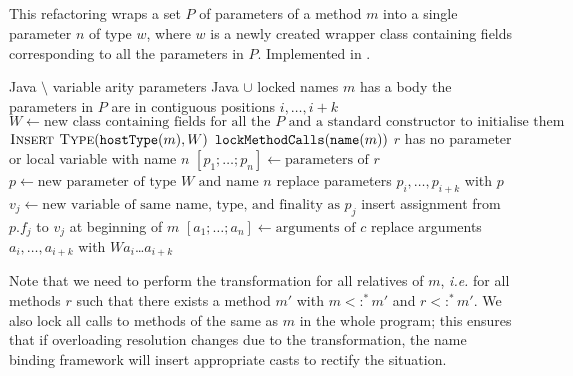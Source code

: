 \subsection{}
This refactoring wraps a set $P$ of parameters of a method $m$ into a single parameter $n$ of type $w$, where $w$ is a newly created wrapper class containing fields corresponding to all the parameters in $P$. Implemented in .

\begin{algorithm}
\caption{$\refactoring{Introduce Parameter Object}(m : \type{Method}, P : \settp{\type{Parameter}}, w : \settp{Name}, n : \settp{Name})$}
\begin{algorithmic}[1]
\REQUIRE Java $\setminus$ variable arity parameters
\ENSURE Java $\cup$ locked names
\medskip
\STATE \assert $m$ has a body
\STATE \assert the parameters in $P$ are in contiguous positions $i, \ldots, i+k$
\STATE $W \leftarrow \text{new class containing fields for all the $P$ and a standard constructor to initialise them}$
\STATE $\textsc{Insert Type}(\text{\texttt{hostType}}(m), W)$
\STATE $\text{\texttt{lockMethodCalls}}(\text{\texttt{name}}(m))$
  \STATE \assert $r$ has no parameter or local variable with name $n$
  \STATE $[p_1;\ldots;p_n] \leftarrow \text{parameters of $r$}$
  \STATE $p \leftarrow \text{new parameter of type $W$ and name $n$}$
  \STATE replace parameters $p_i, \ldots, p_{i+k}$ with $p$
    \STATE $v_j \leftarrow \text{new variable of same name, type, and finality as $p_j$}$
    \STATE insert assignment from $p.f_j$ to $v_j$ at beginning of $m$
  \ENDFOR
    \STATE $[a_1;\ldots;a_n] \leftarrow \text{arguments of $c$}$
    \STATE replace arguments $a_i, \ldots, a_{i+k}$ with $W$\code{(}$a_i$\code{,}\ldots\code{,}$a_{i+k}$\code{)}
  \ENDFOR
\ENDFOR
\end{algorithmic}
\end{algorithm}

Note that we need to perform the transformation for all relatives of $m$, \emph{i.e.} for all methods $r$ such that there exists a method $m'$ with $m<:^*m'$ and $r<:^*m'$. We also lock all calls to methods of the same as $m$ in the whole program; this ensures that if overloading resolution changes due to the transformation, the name binding framework will insert appropriate casts to rectify the situation.
